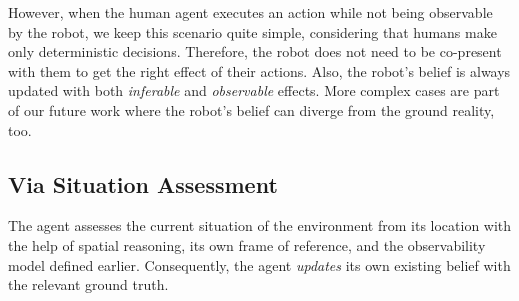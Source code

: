 \documentclass[letterpaper]{article} %
\begin{document}


However, when the human agent executes an action while not being observable by the robot, we keep this scenario quite simple, considering that humans make only deterministic decisions. 
Therefore, the robot does not need to be co-present with them to get the right effect of their actions. Also, the robot's belief is always updated with both \textit{inferable} and \textit{observable} effects. More complex cases are part of our future work where the robot's belief can diverge from the ground reality, too. 

\subsection{Via Situation Assessment}

The agent assesses the current situation of the environment from its location
with the help of spatial reasoning, its own frame of reference, and the observability model defined earlier. Consequently, the agent \textit{updates} its own existing belief with the relevant ground truth. 
\end{document}
